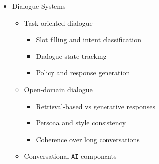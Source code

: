 \documentclass[
]{article}
\providecommand{\tightlist}{%
  \setlength{\itemsep}{0pt}\setlength{\parskip}{0pt}}
\begin{document}
\begin{itemize}
\begin{itemize}
    \begin{itemize}
    \tightlist
    \item
      Knowledge bases and structured KBs
    \item
      \texttt{SPARQL} and semantic parsing
    \item
      Hybrid retrieval over text and structure
    \end{itemize}
  \item
    Conversational QA

    \begin{itemize}
    \tightlist
    \item
      Multi-turn context
    \item
      Reference resolution within conversation
    \end{itemize}
  \item
    Evaluation

    \begin{itemize}
    \tightlist
    \item
      Exact match and \texttt{F1}
    \item
      Faithfulness to retrieved context
    \item
      Adversarial robustness
    \end{itemize}
  \end{itemize}
\item
  Dialogue Systems

  \begin{itemize}
  \tightlist
  \item
    Task-oriented dialogue

    \begin{itemize}
    \tightlist
    \item
      Slot filling and intent classification
    \item
      Dialogue state tracking
    \item
      Policy and response generation
    \end{itemize}
  \item
    Open-domain dialogue

    \begin{itemize}
    \tightlist
    \item
      Retrieval-based vs generative responses
    \item
      Persona and style consistency
    \item
      Coherence over long conversations
    \end{itemize}
  \item
    Conversational \texttt{AI} components


\end{itemize}
\end{itemize}
\end{document}
